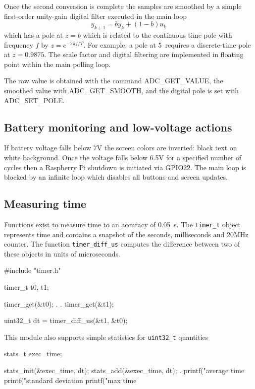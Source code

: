 \documentclass[11pt,fleqn]{article}
\begin{document}
Once the second conversion is complete the samples are smoothed by a simple first-order unity-gain digital filter executed in the main loop 
\[
y_{k+1} = b  y_k + (1-b)u_k
\]
which has a pole at $z=b$ which is related to the continuous time pole with frequency $f$ by $z = e^{-2\pi f/T}$.  For example, a pole at 5\Hz\ requires a discrete-time pole
at $z=0.9875$.
The scale factor and digital filtering are implemented in floating point within the main polling loop.

The raw value is obtained with the command ADC\_GET\_VALUE, the smoothed value with ADC\_GET\_SMOOTH, and the digital pole is set with
ADC\_SET\_POLE.


\subsection{Battery monitoring and low-voltage actions}
If battery voltage falls below 7\unit{V} the screen colors are inverted: black text on white background.
Once the voltage falls below 6.5\unit{V} for a specified number of cycles then a Raspberry Pi shutdown is initiated via GPIO22.
The main loop is blocked by an infinite loop which disables all buttons and screen updates. 

\subsection{Measuring time}
Functions exist to measure time to an accuracy of 0.05\unit{\mu s}.  
The \texttt{timer\_t} object represents time and contains a snapshot of the seconds, milliseconds and 20\unit{MHz}  counter.
The function \texttt{timer\_diff\_us} computes the difference between two of these objects in units of microseconds.

\begin{Code}
#include "timer.h"

timer_t t0, t1;

timer_get(&t0);
 .
 .
timer_get(&t1);

uint32_t dt = timer_diff_us(&t1, &t0);
\end{Code}

This module also supports simple statistics for \texttt{uint32\_t} quantities
\begin{Code}
stats_t exec_time;

stats_init(&exec_time, dt);
stats_add(&exec_time, dt);
 .
printf("average time %
printf("standard deviation %
printf("max time %

\end{Code}
\end{document}

